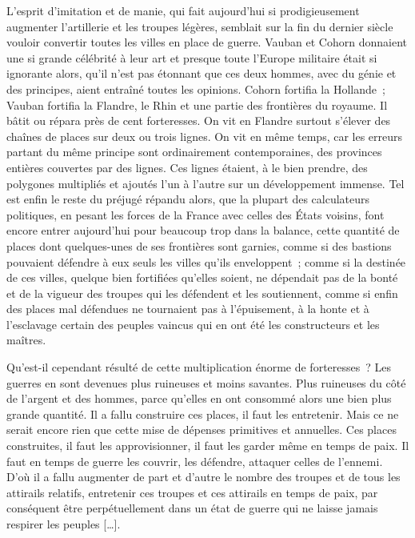 \documentclass[french,twoside]{book} %
\begin{document}
L’esprit d’imitation et de manie, qui fait aujourd’hui si prodigieusement augmenter l’artillerie et les troupes légères, semblait sur la fin du dernier siècle vouloir convertir toutes les villes en place de guerre. Vauban et Cohorn donnaient une si grande célébrité à leur art et presque toute l’Europe militaire était si ignorante alors, qu’il n’est pas étonnant que ces deux hommes, avec du génie et des principes, aient entraîné toutes les opinions. Cohorn fortifia la Hollande ; Vauban fortifia la Flandre, le Rhin et une partie des frontières du royaume. Il bâtit ou répara près de cent forteresses. On vit en Flandre surtout s’élever des chaînes de places sur deux ou trois lignes. On vit en même temps, car les erreurs partant du même principe sont ordinairement contemporaines, des provinces entières couvertes par des lignes. Ces lignes étaient, à le bien prendre, des polygones multipliés et ajoutés l’un à l’autre sur un développement immense. Tel est enfin le reste du préjugé répandu alors, que la plupart des calculateurs politiques, en pesant les forces de la France avec celles des États voisins, font encore entrer aujourd’hui pour beaucoup trop dans la balance, cette quantité de places dont quelques-unes de ses frontières sont garnies, comme si des bastions pouvaient défendre à eux seuls les villes qu’ils enveloppent ; comme si la destinée de ces villes, quelque bien fortifiées qu’elles soient, ne dépendait pas de la bonté et de la vigueur des troupes qui les défendent et les soutiennent, comme si enfin des places mal défendues ne tournaient pas à l’épuisement, à la honte et à l’esclavage certain des peuples vaincus qui en ont été les constructeurs et les maîtres.\par
Qu’est-il cependant résulté de cette multiplication énorme de forteresses ? Les guerres en sont devenues plus ruineuses et moins savantes. Plus ruineuses du côté de l’argent et des hommes, parce qu’elles en ont consommé alors une bien plus grande quantité. Il a fallu construire ces places, il faut les entretenir. Mais ce ne serait encore rien que cette mise de dépenses primitives et annuelles. Ces places construites, il faut les approvisionner, il faut les garder même en temps de paix. Il faut en temps de guerre les couvrir, les défendre, attaquer celles de l’ennemi. D’où il a fallu augmenter de part et d’autre le nombre des troupes et de tous les attirails relatifs, entretenir ces troupes et ces attirails en temps de paix, par conséquent être perpétuellement dans un état de guerre qui ne laisse jamais respirer les peuples […].\par
\end{document}
